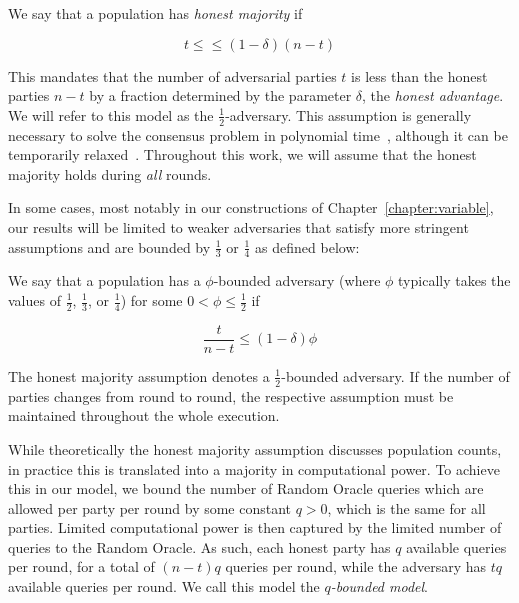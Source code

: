 \begin{definition}\index{$\delta$}
  We say that a population has \emph{honest majority} if

  \[
  t \leq \leq (1 - \delta)(n - t)
  \]
\end{definition}

This mandates that the number of adversarial parties $t$ is less than the honest
parties $n - t$ by a fraction determined by the parameter $\delta$, the
\emph{honest advantage}. We will refer to
this model as the $\frac{1}{2}$-adversary. This assumption is generally
necessary to solve the consensus problem in polynomial time~\cite{okun},
although it can be temporarily relaxed~\cite{dishonest}. Throughout this
work, we will assume that the honest majority holds during \emph{all} rounds.

In some cases, most notably in our constructions of
Chapter~\ref{chapter:variable}, our results will be limited to weaker
adversaries that satisfy more stringent assumptions and are bounded by
$\frac{1}{3}$ or $\frac{1}{4}$ as defined below:

\begin{definition}
  We say that a population has a $\phi$-bounded adversary (where $\phi$
  typically takes the values of $\frac{1}{2}$, $\frac{1}{3}$, or $\frac{1}{4}$)
  for some $0 < \phi \leq \frac{1}{2}$ if

  \[
  \frac{t}{n - t} \leq (1 - \delta)\phi
  \]
\end{definition}

The honest majority assumption denotes a $\frac{1}{2}$-bounded adversary. If the
number of parties changes from round to round, the respective assumption must be
maintained throughout the whole execution.

While theoretically the honest majority assumption discusses population counts,
in practice this is translated into a majority in computational power. To
achieve this in our model, we bound the number of Random Oracle queries which
are allowed per party per round by some constant $q > 0$, which is the same for all
parties. Limited computational power is then captured by the limited number of
queries to the Random Oracle. As such, each honest party has $q$ available
queries per round, for a total of $(n - t)q$ queries per round, while the
adversary has $tq$ available queries per round. We call this model the
\emph{$q$-bounded model}.

